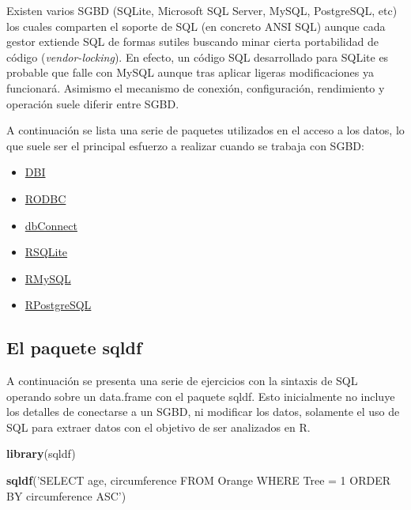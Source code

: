\documentclass[]{book}
\newenvironment{Shaded}{\begin{snugshade}}{\end{snugshade}}
\newcommand{\KeywordTok}[1]{\textcolor[rgb]{0.13,0.29,0.53}{\textbf{#1}}}
\newcommand{\StringTok}[1]{\textcolor[rgb]{0.31,0.60,0.02}{#1}}
\newcommand{\NormalTok}[1]{#1}
\providecommand{\tightlist}{%
  \setlength{\itemsep}{0pt}\setlength{\parskip}{0pt}}
\begin{document}
Existen varios SGBD (SQLite, Microsoft SQL Server, MySQL, PostgreSQL,
etc) los cuales comparten el soporte de SQL (en concreto ANSI SQL)
aunque cada gestor extiende SQL de formas sutiles buscando minar cierta
portabilidad de código (\emph{vendor-locking}). En efecto, un código SQL
desarrollado para SQLite es probable que falle con MySQL aunque tras
aplicar ligeras modificaciones ya funcionará. Asimismo el mecanismo de
conexión, configuración, rendimiento y operación suele diferir entre
SGBD.

A continuación se lista una serie de paquetes utilizados en el acceso a
los datos, lo que suele ser el principal esfuerzo a realizar cuando se
trabaja con SGBD:

\begin{itemize}
\tightlist
\item
  \href{https://cran.r-project.org/web/packages/DBI/index.html}{DBI}
\item
  \href{https://cran.r-project.org/web/packages/RODBC/index.html}{RODBC}
\item
  \href{https://cran.r-project.org/web/packages/dbConnect/index.html}{dbConnect}
\item
  \href{https://cran.r-project.org/web/packages/RSQLite/index.html}{RSQLite}
\item
  \href{https://cran.r-project.org/web/packages/RMySQL/index.html}{RMySQL}
\item
  \href{https://cran.r-project.org/web/packages/RPostgreSQL/index.html}{RPostgreSQL}
\end{itemize}

\subsection{El paquete sqldf}\label{el-paquete-sqldf}

A continuación se presenta una serie de ejercicios con la sintaxis de
SQL operando sobre un data.frame con el paquete sqldf. Esto inicialmente
no incluye los detalles de conectarse a un SGBD, ni modificar los datos,
solamente el uso de SQL para extraer datos con el objetivo de ser
analizados en R.

\begin{Shaded}
\begin{Highlighting}[]
\KeywordTok{library}\NormalTok{(sqldf)}
\end{Highlighting}
\end{Shaded}

\begin{Shaded}
\begin{Highlighting}[]
\KeywordTok{sqldf}\NormalTok{(}\StringTok{'SELECT age, circumference FROM Orange WHERE Tree = 1 ORDER BY circumference ASC'}\NormalTok{)}
\end{Highlighting}
\end{Shaded}
\end{document}

